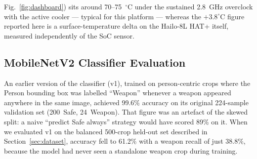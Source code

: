 \documentclass{ieeeaccess}
\begin{document}
Fig.~\ref{fig:dashboard}) sits around 70--75~$^\circ$C under the sustained 2.8~GHz overclock with the active cooler --- typical for this platform --- whereas the $+3.8^\circ$C figure reported here is a surface-temperature delta on the Hailo-8L HAT+ itself, measured independently of the SoC sensor.

\begin{table}[ht!]
\caption{\textbf{FP32 Baseline and INT8 Deployment on the Same Test Split.} Both columns evaluated on the identical held-out test split (622~images, 351~instances). FP32: Ultralytics \texttt{val} on RTX~4090, \texttt{conf=0.001}, \texttt{iou=0.7}. INT8: \texttt{best\_v5.hef} on the deployed Hailo-8L, on-chip \texttt{HAILO\_NMS\_BY\_CLASS} (deployment thresholds \texttt{conf=0.25}, \texttt{iou=0.45}), letterboxed input, COCO-style 101-point AP integration matched to Ultralytics' \texttt{DetMetrics}.}
\label{tab:quant}
\setlength{\tabcolsep}{3pt}
\centering\small
{}
\end{table}


\subsection{MobileNetV2 Classifier Evaluation}
\label{sec:classifier_eval}
An earlier version of the classifier (v1), trained on person-centric crops where the Person bounding box was labelled ``Weapon'' whenever a weapon appeared anywhere in the same image, achieved 99.6\% accuracy on its original 224-sample validation set (200~Safe, 24~Weapon). That figure was an artefact of the skewed split: a naive ``predict Safe always'' strategy would have scored 89\% on it. When we evaluated v1 on the balanced 500-crop held-out set described in Section~\ref{sec:dataset}, accuracy fell to 61.2\% with a weapon recall of just 38.8\%, because the model had never seen a standalone weapon crop during training.
\end{document}
